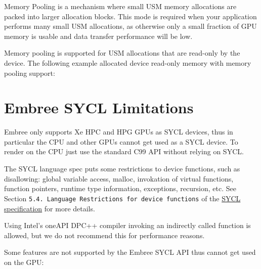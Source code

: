 Memory Pooling is a mechanism where small USM memory allocations are
packed into larger allocation blocks. This mode is required when your
application performs many small USM allocations, as otherwise only a
small fraction of GPU memory is usable and data transfer performance
will be low.

Memory pooling is supported for USM allocations that are read-only by
the device. The following example allocated device read-only memory with
memory pooling support:

\begin{Shaded}
\begin{Highlighting}[]
\OperatorTok{::}\OperatorTok{(}\OperatorTok{,}\OperatorTok{,}\OperatorTok{,}
\OperatorTok{::}\OperatorTok{::}\OperatorTok{::}\OperatorTok{::}\OperatorTok{::}\OperatorTok{());}
\end{Highlighting}
\end{Shaded}

\section{Embree SYCL Limitations}\label{embree-sycl-limitations}

Embree only supports Xe HPC and HPG GPUs as SYCL devices, thus in
particular the CPU and other GPUs cannot get used as a SYCL device. To
render on the CPU just use the standard C99 API without relying on SYCL.

The SYCL language spec puts some restrictions to device functions, such
as disallowing: global variable access, malloc, invokation of virtual
functions, function pointers, runtime type information, exceptions,
recursion, etc. See Section
\texttt{5.4.\ Language\ Restrictions\ for\ device\ functions} of the
\href{https://www.khronos.org/registry/SYCL/specs/sycl-2020/html/sycl-2020.html\#sec:language.restrictions.kernels}{SYCL
specification} for more details.

Using Intel's oneAPI DPC++ compiler invoking an indirectly called
function is allowed, but we do not recommend this for performance
reasons.

Some features are not supported by the Embree SYCL API thus cannot get
used on the GPU:

